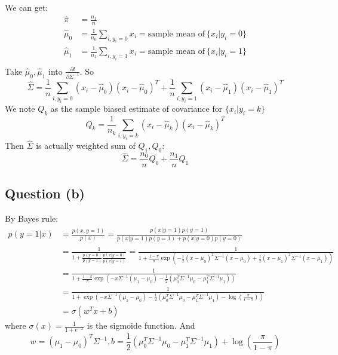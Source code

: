 \documentclass{article}
\newcommand{\pd}[2]{\frac{\partial {#1}}{\partial {#2}}}
\begin{document}
	We can get:
	\begin{equation} \label{LDAresult}
	\begin{split}
	\hat{\pi} &= \frac{n_1}{n}\\
	\hat{\mu}_0 &= \frac{1}{n_0} \sum_{i,y_i=0} x_i  = \text{sample mean of}\ \{x_i|y_i=0\}\\
	\hat{\mu}_1 &= \frac{1}{n_1} \sum_{i,y_i=1} x_i  = \text{sample mean of}\ \{x_i|y_i=1\}\\
	\end{split}
	\end{equation}
	Take $\hat{\mu}_0,\hat{\mu}_1$ into $\pd{l}{\Sigma^{-1}}$. So
	$$
	\hat{\Sigma} = \frac{1}{n} \sum_{i,y_i=0} (x_i-\hat{\mu}_0) (x_i-\hat{\mu}_0)^T + \frac{1}{n} \sum_{i,y_i=1} (x_i-\hat{\mu}_1) (x_i-\hat{\mu}_1)^T
	$$
	We note $Q_k$ as the sample biased estimate of covariance for $\{x_i|y_i=k\}$
	$$
	Q_k = \frac{1}{n_k}\sum_{i,y_i=k} (x_i-\hat{\mu}_k) (x_i-\hat{\mu}_k)^T
	$$
	Then $\hat{\Sigma}$ is actually weighted sum of $Q_1,Q_0$:
	$$
	\hat{\Sigma} = \frac{n_0}{n} Q_0 + \frac{n_1}{n} Q_1
	$$
	
	\subsection{Question (b)}
	By Bayes rule:
	\begin{equation*}
	\begin{split}
	p(y=1|x) &= \frac{p(x,y=1)}{p(x)}=\frac{p(x|y=1)p(y=1)}{p(x|y=1)p(y=1) + p(x|y=0)p(y=0)}\\
	&=\frac{1}{1+\frac{p(y=0)}{p(y=1)} \frac{p(x|y=0)}{p(x|y=1)}} = \frac{1}{1+\frac{1-\pi}{\pi}\exp(- \frac{1}{2} (x-\mu_0)^T \Sigma^{-1} (x-\mu_0) + \frac{1}{2} (x-\mu_1)^T \Sigma^{-1} (x-\mu_1))}\\
	&= \frac{1}{1+\frac{1-\pi}{\pi}\exp(-x\Sigma^{-1}(\mu_1-\mu_0) - \frac{1}{2} (\mu_0^T\Sigma^{-1}\mu_0-\mu_1^T\Sigma^{-1}\mu_1))}\\
	&= \frac{1}{1+\exp(-x\Sigma^{-1}(\mu_1-\mu_0) - \frac{1}{2} (\mu_0^T\Sigma^{-1}\mu_0-\mu_1^T\Sigma^{-1}\mu_1) - \log (\frac{\pi}{1-\pi}) )}\\
	&= \sigma(w^T x + b)
	\end{split}
	\end{equation*}
	where $\sigma(x) = \frac{1}{1+e^{-x}}$ is the sigmoide function. And
	\begin{equation}\label{LDA}
	w = (\mu_1-\mu_0)^T\Sigma^{-1}, b=\frac{1}{2} (\mu_0^T\Sigma^{-1}\mu_0-\mu_1^T\Sigma^{-1}\mu_1) + \log (\frac{\pi}{1-\pi})
	\end{equation}
\end{document}
